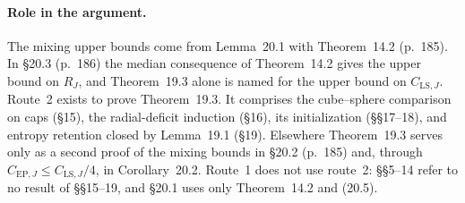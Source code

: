\documentclass[11pt]{article}
\newcommand{\ploc}[2]{#1}
\begin{document}
\paragraph{Role in the argument.}
The mixing upper bounds come from Lemma~20.1 with Theorem~14.2
\ploc{(p.~185)}{dynamics.tex:137--148}. In
\ploc{\S20.3 (p.~186)}{dynamics.tex:196--201} the median consequence of
Theorem~14.2 gives the upper bound on $R_J$, and Theorem~19.3 alone is named
for the upper bound on $C_{\mathrm{LS},J}$. Route~2 exists to prove Theorem~19.3. It comprises the
cube--sphere comparison on caps (\S15), the radial-deficit induction (\S16),
its initialization (\S\S17--18), and entropy retention closed by Lemma~19.1
(\S19). Elsewhere Theorem~19.3 serves only as a second proof of the mixing
bounds in \ploc{\S20.2 (p.~185)}{dynamics.tex:150--185} and, through
$C_{\mathrm{EP},J}\le C_{\mathrm{LS},J}/4$, in
\ploc{Corollary~20.2}{dynamics.tex:249--263}. Route~1 does not use route~2:
\S\S5--14 refer to no result of \S\S15--19, and \S20.1 uses only Theorem~14.2
and (20.5).
\end{document}
